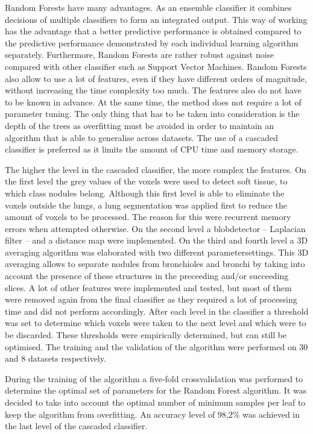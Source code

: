 Random Forests have many advantages. As an ensemble classifier it combines
decisions of multiple classifiers to form an integrated output. This way of
working has the advantage that a better predictive performance is obtained
compared to the predictive performance demonstrated by each individual learning
algorithm separately. Furthermore, Random Forests are rather robust against
noise compared with other classifier such as Support Vector Machines. Random
Forests also allow to use a lot of features, even if they have different orders
of magnitude, without increasing the time complexity too much. The features also
do not have to be known in advance. At the same time, the method does not
require a lot of parameter tuning. The only thing that has to be taken into
consideration is the depth of the trees as overfitting must be avoided in order
to maintain an algorithm that is able to generalise across datasets. The use of
a cascaded classifier is preferred as it limits the amount of CPU time and
memory storage.
 
The higher the level in the cascaded classifier, the more complex the features.
On the first level the grey values of the voxels were used to detect soft
tissue, to which class nodules belong. Although this first level is able to
eliminate the voxels outside the lungs, a lung segmentation was applied first to
reduce the amount of voxels to be processed. The reason for this were recurrent
memory errors when attempted otherwise. On the second level a blobdetector --
Laplacian filter -- and a distance map were implemented. On the third and fourth
level a 3D averaging algorithm was elaborated with two different
parametersettings. This 3D averaging allows to separate nodules from bronchioles
and bronchi by taking into account the presence of these structures in the
preceeding and/or succeeding slices. A lot of other features were implemented
and tested, but most of them were removed again from the final classifier as
they required a lot of processing time and did not perform accordingly. After
each level in the classifier a threshold was set to determine which voxels were
taken to the next level and which were to be discarded. These thresholds were
empirically determined, but can still be optimised. The training and the
validation of the algorithm were performed on 30 and 8 datasets respectively.

During the training of the algorithm a five-fold crossvalidation was performed
to determine the optimal set of parameters for the Random Forest algorithm. It
was decided to take into account the optimal number of minimum samples per leaf
to keep the algorithm from overfitting. An accuracy level of 98,2\% was achieved
in the last level of the cascaded classifier.

